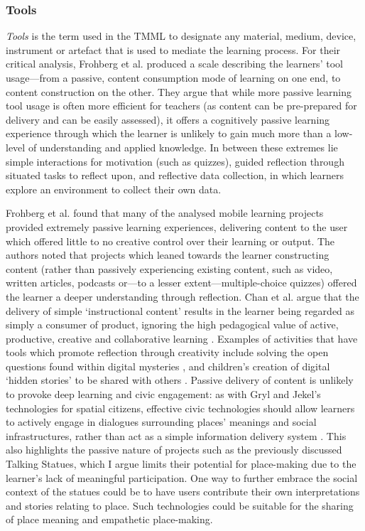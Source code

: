 \subsubsection{Tools}
\textit{Tools} is the term used in the TMML to designate any material, medium, device, instrument or artefact that is used to mediate the learning process. For their critical analysis, Frohberg et al. produced a scale describing the learners' tool usage---from a passive, content consumption mode of learning on one end, to content construction on the other. They argue that while more passive learning tool usage is often more efficient for teachers (as content can be pre-prepared for delivery and can be easily assessed), it offers a cognitively passive learning experience through which the learner is unlikely to gain much more than a low-level of understanding and applied knowledge. In between these extremes lie simple interactions for motivation (such as quizzes), guided reflection through situated tasks to reflect upon, and reflective data collection, in which learners explore an environment to collect their own data. 

Frohberg et al. found that many of the analysed mobile learning projects provided extremely passive learning experiences, delivering content to the user which offered little to no creative control over their learning or output. The authors noted that projects which leaned towards the learner constructing content (rather than passively experiencing existing content, such as video, written articles, podcasts or---to a lesser extent---multiple-choice quizzes) offered the learner a deeper understanding through reflection. Chan et al. argue that the delivery of simple `instructional content' results in the learner being regarded as simply a consumer of product, ignoring the high pedagogical value of active, productive, creative and collaborative learning \citep{Chan2006}. Examples of activities that have tools which promote reflection through creativity include solving the open questions found within digital mysteries \citep{Kharrufa2010}, and children’s creation of digital ‘hidden stories’ to be shared with others \citep{Wood2014}. Passive delivery of content is unlikely to provoke deep learning and civic engagement: as with Gryl and Jekel’s technologies for spatial citizens, effective civic technologies should allow learners to actively engage in dialogues surrounding places’ meanings and social infrastructures, rather than act as a simple information delivery system \citep{Gryl2012}. This also highlights the passive nature of projects such as the previously discussed Talking Statues, which I argue limits their potential for place-making due to the learner's lack of meaningful participation. One way to further embrace the social context of the statues could be to have users contribute their own interpretations and stories relating to place. Such technologies could be suitable for the sharing of place meaning and empathetic place-making.

